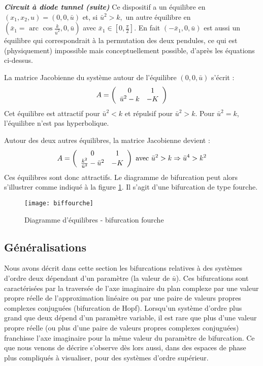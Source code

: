 \begin{exemple}{\bf \em Circuit {à} diode tunnel (suite)}
Ce dispositif a un équilibre en $(x_1, x_2, u)=(0,0, \bar u)$ et, si $\bar
u^2 > k,$ un autre équilibre en $(\bar x_1 = \mbox{ arc }\cos \frac{k}{\bar u^2}, 0,
\bar u)$ avec $\bar x_1 \in [0,\frac{\pi}{2}]$.  En fait $(-\bar x_1, 0, \bar
u)$ est aussi un équilibre qui correspondrait à la permutation des deux
pendules, ce qui est (physiquement) impossible mais conceptuellement
possible, d'après les équations ci-dessus.

La matrice Jacobienne du système autour de l'équilibre $(0,0, \bar u)$
s'écrit :
$$
A = \bma{cc}0 & 1\\ \bar u^2-k & -K
\ema
$$
Cet équilibre est attractif pour $\bar u^2 < k$ et répulsif pour $\bar u^2>k$.  Pour $\bar u^2
= k$, l'équilibre n'est pas hyperbolique.

Autour des deux autres équilibres, la matrice Jacobienne devient :
$$
A = \bma{cc} 0 & 1\\ \frac{k^2}{\bar u^2} -\bar u^2 & -K \ema \mbox{ avec } \bar u^2 > k
\Rightarrow \bar u^4 > k^2
$$
Ces équilibres sont donc attractifs.  Le diagramme de bifurcation peut alors
s'illustrer comme indiqué à la figure \ref{fig:biffourche}.  Il s'agit d'une bifurcation de
type fourche.
\begin{figure}[htbp] 
   \centering
   \texttt{[image: biffourche]} 
   \caption{Diagramme d'équilibres - bifurcation fourche}
   \label{fig:biffourche}
\end{figure}
 
\subsection{Généralisations}

Nous avons d{é}crit dans cette section les bifurcations
relatives {à} des syst{è}mes d'ordre deux d{é}pendant d'un param{è}tre (la valeur de $\bar
u$). Ces bifurcations sont caract{é}ris{é}es par la travers{é}e de l'axe imaginaire du
plan complexe par une valeur propre r{é}elle de l'approximation lin{é}aire ou par une
paire de valeurs propres complexes conjugu{é}es (bifurcation de Hopf).  Lorsqu'un
syst{è}me d'ordre plus grand que deux d{é}pend d'un param{è}tre variable, il est rare que
plus d'une valeur propre r{é}elle (ou plus d'une paire de valeurs propres complexes
conjugu{é}es) franchisse l'axe imaginaire pour la m{ê}me valeur du param{è}tre de
bifurcation. Ce que nous venons de d{é}crire s'observe d{è}s lors aussi, dans des espaces
de phase plus compliqu{é}s {à} visualiser, pour des syst{è}mes d'ordre
 sup{é}rieur.  


\end{exemple}
